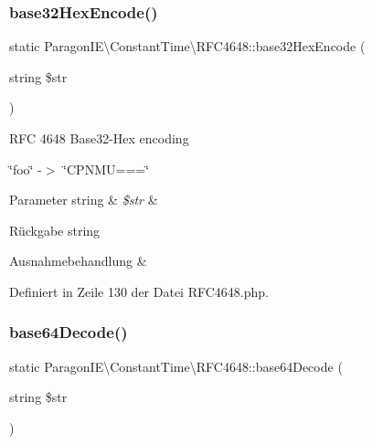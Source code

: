 \subsubsection{\texorpdfstring{base32\+Hex\+Encode()}{base32HexEncode()}}
{\footnotesize\ttfamily static Paragon\+I\+E\textbackslash{}\+Constant\+Time\textbackslash{}\+R\+F\+C4648\+::base32\+Hex\+Encode (\begin{DoxyParamCaption}\item[{string}]{\$str }\end{DoxyParamCaption})\hspace{0.3cm}{\ttfamily [static]}}

R\+FC 4648 Base32-\/\+Hex encoding

\char`\"{}foo\char`\"{} -\/$>$ \char`\"{}\+C\+P\+N\+M\+U===\char`\"{}


\begin{DoxyParams}[1]{Parameter}
string & {\em \$str} & \\
\hline
\end{DoxyParams}
\begin{DoxyReturn}{Rückgabe}
string 
\end{DoxyReturn}

\begin{DoxyExceptions}{Ausnahmebehandlung}
{\em } & \\
\hline
\end{DoxyExceptions}


Definiert in Zeile 130 der Datei R\+F\+C4648.\+php.

\mbox{\label{class_paragon_i_e_1_1_constant_time_1_1_r_f_c4648_a9805353dd583a6ff4780ea900a0e073e}} 
\subsubsection{\texorpdfstring{base64\+Decode()}{base64Decode()}}
{\footnotesize\ttfamily static Paragon\+I\+E\textbackslash{}\+Constant\+Time\textbackslash{}\+R\+F\+C4648\+::base64\+Decode (\begin{DoxyParamCaption}\item[{string}]{\$str }\end{DoxyParamCaption})\hspace{0.3cm}{\ttfamily [static]}}

